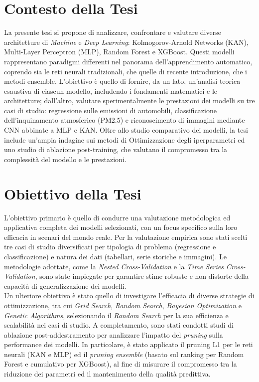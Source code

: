 \documentclass[a4paper,12pt]{report}
\begin{document}
	\section*{Contesto della Tesi}
	La presente tesi si propone di analizzare, confrontare e valutare diverse architetture di \textit{Machine} e \textit{Deep Learning}: Kolmogorov-Arnold Networks (KAN), Multi-Layer Perceptron (MLP), Random Forest e XGBoost. Questi modelli rappresentano paradigmi differenti nel panorama dell'apprendimento automatico, coprendo sia le reti neurali tradizionali, che quelle di recente introduzione, che i metodi ensemble. L'obiettivo è quello di fornire, da un lato, un'analisi teorica esaustiva di ciascun modello, includendo i fondamenti matematici e le architetture; dall'altro, valutare sperimentalmente le prestazioni dei modelli su tre casi di studio: regressione sulle emissioni di automobili, classificazione dell'inquinamento atmosferico (PM2.5) e riconoscimento di immagini mediante CNN abbinate a MLP e KAN. Oltre allo studio comparativo dei modelli, la tesi include un'ampia indagine sui metodi di Ottimizzazione degli iperparametri ed uno studio di ablazione post-training, che valutano il compromesso tra la complessità del modello e le prestazioni.
	
	\section*{Obiettivo della Tesi}
	L'obiettivo primario è quello di condurre una valutazione metodologica ed applicativa completa dei modelli selezionati, con un focus specifico sulla loro efficacia in scenari del mondo reale. Per la valutazione empirica sono stati scelti tre casi di studio diversificati per tipologia di problema (regressione e classificazione) e natura dei dati (tabellari, serie storiche e immagini). Le metodologie adottate, come la \textit{Nested Cross-Validation} e la \textit{Time Series Cross-Validation}, sono state impiegate per garantire stime robuste e non distorte della capacità di generalizzazione dei modelli. \\
	Un ulteriore obiettivo è stato quello di investigare l'efficacia di diverse strategie di ottimizzazione, tra cui \textit{Grid Search}, \textit{Random Search}, \textit{Bayesian Optimization} e \textit{Genetic Algorithms}, selezionando il \textit{Random Search} per la sua efficienza e scalabilità nei casi di studio. A completamento, sono stati condotti studi di ablazione post-addestramento per analizzare l'impatto del \textit{pruning} sulla performance dei modelli. In particolare, è stato applicato il pruning L1 per le reti neurali (KAN e MLP) ed il \textit{pruning} \textit{ensemble} (basato sul ranking per Random Forest e cumulativo per XGBoost), al fine di misurare il compromesso tra la riduzione dei parametri ed il mantenimento della qualità predittiva.
	
\end{document}
